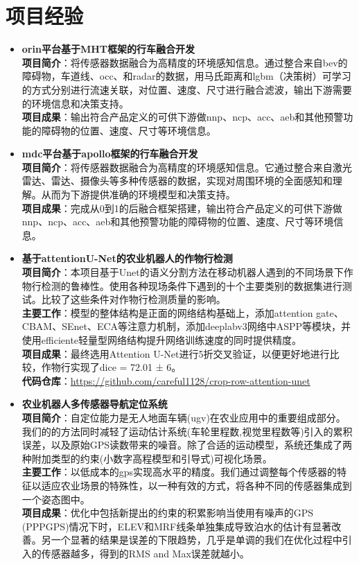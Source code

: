 \documentclass[11pt,a4paper]{article}
\begin{document}
\section*{项目经验}
\begin{itemize}[leftmargin=*]
    \item \textbf{orin平台基于MHT框架的行车融合开发} \\
    \textbf{项目简介}：将传感器数据融合为高精度的环境感知信息。通过整合来自bev的障碍物，车道线、occ、和radar的数据，用马氏距离和lgbm（决策树）可学习的方式分别进行流速关联，对位置、速度、尺寸进行融合滤波，输出下游需要的环境信息和决策支持。 \\
    \textbf{项目成果}：输出符合产品定义的可供下游做nnp、ncp、acc、aeb和其他预警功能的障碍物的位置、速度、尺寸等环境信息。
    
    \item \textbf{mdc平台基于apollo框架的行车融合开发} \\
    \textbf{项目简介}：将传感器数据融合为高精度的环境感知信息。它通过整合来自激光雷达、雷达、摄像头等多种传感器的数据，实现对周围环境的全面感知和理解。从而为下游提供准确的环境模型和决策支持。 \\
    \textbf{项目成果}：完成从0到1的后融合框架搭建，输出符合产品定义的可供下游做nnp、ncp、acc、aeb和其他预警功能的障碍物的位置、速度、尺寸等环境信息。
    
    \item \textbf{基于attentionU-Net的农业机器人的作物行检测} \\
    \textbf{项目简介}：本项目基于Unet的语义分割方法在移动机器人遇到的不同场景下作物行检测的鲁棒性。使用各种现场条件下遇到的十个主要类别的数据集进行测试。比较了这些条件对作物行检测质量的影响。 \\
    \textbf{主要工作}：模型的整体结构是正面的网络结构基础上，添加attention gate、CBAM、SEnet、ECA等注意力机制，添加deeplabv3网络中ASPP等模块，并使用efficiente轻量型网络结构提升网络训练速度的同时提供精度。 \\
    \textbf{项目成果}：最终选用Attention U-Net进行5折交叉验证，以便更好地进行比较，作物行实现了dice = 72.01 ± 6。 \\
    \textbf{代码仓库}：\url{https://github.com/careful1128/crop-row-attention-unet}
    
    \item \textbf{农业机器人多传感器导航定位系统} \\
    \textbf{项目简介}：自定位能力是无人地面车辆(ugv)在农业应用中的重要组成部分。我们的的方法同时减轻了运动估计系统(车轮里程数,视觉里程数等)引入的累积误差，以及原始GPS读数带来的噪音。除了合适的运动模型，系统还集成了两种附加类型的约束(小数字高程模型和引导式)可视化场景。 \\
    \textbf{主要工作}：以低成本的gps实现高水平的精度。我们通过调整每个传感器的特征以适应农业场景的特殊性，以一种有效的方式，将各种不同的传感器集成到一个姿态图中。 \\
    \textbf{项目成果}：优化中包括新提出的约束的积累影响当使用有噪声的GPS (PPPGPS)情况下时，ELEV和MRF线条单独集成导致泊水的估计有显著改善。另一个显著的结果是误差的下限趋势，几乎是单调的我们在优化过程中引入的传感器越多，得到的RMS and Max误差就越小。


\end{itemize}
\end{document}
